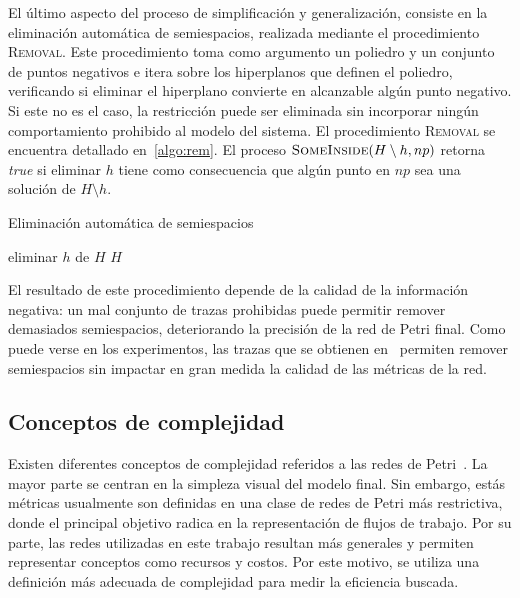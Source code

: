 El último aspecto del proceso de simplificación y generalización,
consiste en la eliminación automática  de semiespacios,
realizada mediante el procedimiento \textsc{Removal}.
Este procedimiento toma como argumento un poliedro y un conjunto de puntos
negativos e itera sobre los hiperplanos que definen el poliedro,
verificando si eliminar el hiperplano convierte en alcanzable algún punto negativo.
Si este no es el caso, la restricción puede ser eliminada sin incorporar
ningún comportamiento prohibido al modelo del sistema. El procedimiento \textsc{Removal}
se encuentra detallado en~\autoref{algo:rem}. El proceso $\textsc{SomeInside}(H \setminus h, np)$
retorna \textit{true} si eliminar $h$ tiene como consecuencia que algún punto en $np$
sea una solución de $H \setminus {h}$.

\begin{algorithm}[h]
\caption{Eliminación automática de semiespacios}
    \begin{algorithmic}[1]
                    \State eliminar $h$ de $H$
                \EndIf
            \EndFor
            \State \Return $H$
        \EndProcedure
    \end{algorithmic}
    \label{algo:rem}
\end{algorithm}

El resultado de este procedimiento depende de la calidad de la información negativa:
un mal conjunto de trazas prohibidas puede permitir remover demasiados semiespacios,
deteriorando la precisión de la red de Petri final. Como puede verse en los experimentos,
las trazas que se obtienen en~\cite{BrouckeWVB14} permiten remover semiespacios sin 
impactar en gran medida la calidad de las métricas de la red.

\subsection{Conceptos de complejidad}
\label{sec:3.complexity}

Existen diferentes conceptos de complejidad referidos a las redes de Petri~\cite{Lassen08,Mendling2007}. 
La mayor parte se centran en la simpleza visual del modelo final. Sin embargo, estás métricas usualmente 
son definidas en una clase de redes de Petri más restrictiva, donde el principal objetivo radica en la 
representación de flujos de trabajo. Por su parte, las redes utilizadas en este trabajo resultan más generales
y permiten representar conceptos como recursos y costos. Por este motivo, se utiliza una definición más adecuada
de complejidad para medir la eficiencia buscada.

